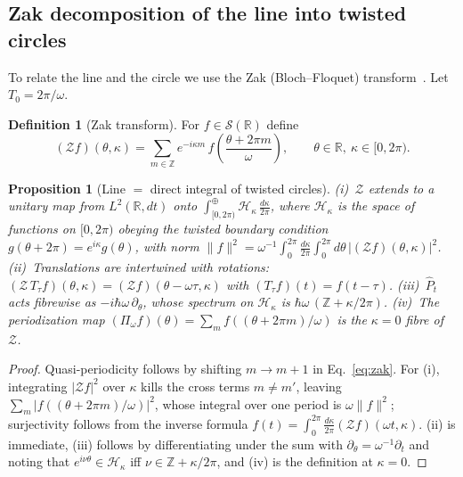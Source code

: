 \documentclass[aps,prd,onecolumn,notitlepage,10pt,amsmath,amssymb,amsfonts,nofootinbib]{revtex4-2}
\newtheorem{proposition}{Proposition}
\theoremstyle{definition}
\newtheorem{definition}{Definition}
\theoremstyle{remark}
\newcommand{\Hil}{\mathcal{H}}
\newcommand{\Pt}{\widehat{P}_t}
\newcommand{\R}{\mathbb{R}}
\newcommand{\Z}{\mathbb{Z}}
\begin{document}
\subsection{Zak decomposition of the line into twisted circles}
\label{sec:zak}
To relate the line and the circle we use the Zak (Bloch--Floquet) transform~\cite{Zak1967}. Let $T_0=2\pi/\omega$.

\begin{definition}[Zak transform]
For $f\in\mathcal S(\R)$ define
\begin{equation}
  (\mathcal Z f)(\theta,\kappa)=\sum_{m\in\Z}e^{-i\kappa m}\,f\!\left(\frac{\theta+2\pi m}{\omega}\right),\qquad \theta\in\R,\ \kappa\in[0,2\pi).
  \label{eq:zak}
\end{equation}
\end{definition}

\begin{proposition}[Line $=$ direct integral of twisted circles]
\label{prop:zak}
(i)~$\mathcal Z$ extends to a unitary map from $L^2(\R,dt)$ onto $\int^\oplus_{[0,2\pi)}\Hil_\kappa\,\frac{d\kappa}{2\pi}$, where $\Hil_\kappa$ is the space of functions on $[0,2\pi)$ obeying the twisted boundary condition $g(\theta+2\pi)=e^{i\kappa}g(\theta)$, with norm $\|f\|^2=\omega^{-1}\int_0^{2\pi}\frac{d\kappa}{2\pi}\int_0^{2\pi}d\theta\,|(\mathcal Zf)(\theta,\kappa)|^2$.
(ii)~Translations are intertwined with rotations: $(\mathcal Z\,T_\tau f)(\theta,\kappa)=(\mathcal Z f)(\theta-\omega\tau,\kappa)$ with $(T_\tau f)(t)=f(t-\tau)$.
(iii)~$\Pt$ acts fibrewise as $-i\hbar\omega\,\partial_\theta$, whose spectrum on $\Hil_\kappa$ is $\hbar\omega\,(\Z+\kappa/2\pi)$.
(iv)~The periodization map $(\Pi_\omega f)(\theta)=\sum_m f((\theta+2\pi m)/\omega)$ is the $\kappa=0$ fibre of $\mathcal Z$.
\end{proposition}

\begin{proof}
Quasi-periodicity follows by shifting $m\to m+1$ in Eq.~\eqref{eq:zak}. For (i), integrating $|\mathcal Zf|^2$ over $\kappa$ kills the cross terms $m\neq m'$, leaving $\sum_m|f((\theta+2\pi m)/\omega)|^2$, whose integral over one period is $\omega\|f\|^2$; surjectivity follows from the inverse formula $f(t)=\int_0^{2\pi}\frac{d\kappa}{2\pi}(\mathcal Zf)(\omega t,\kappa)$. (ii) is immediate, (iii) follows by differentiating under the sum with $\partial_\theta=\omega^{-1}\partial_t$ and noting that $e^{i\nu\theta}\in\Hil_\kappa$ iff $\nu\in\Z+\kappa/2\pi$, and (iv) is the definition at $\kappa=0$.
\end{proof}
\end{document}

